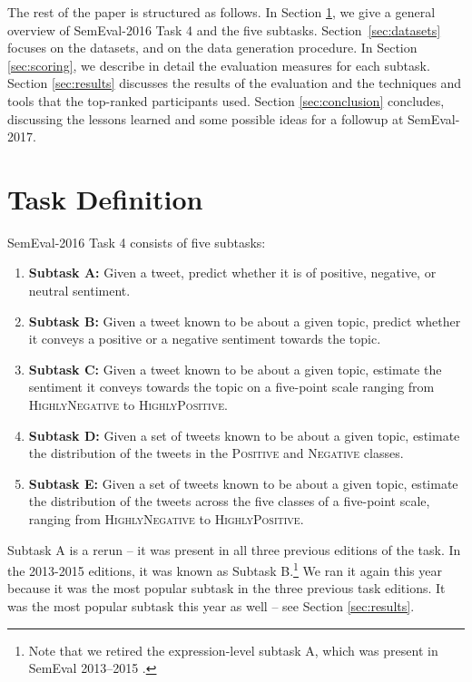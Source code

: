 \documentclass[11pt,letterpaper]{article}
\begin{document}
The rest of the paper is structured as follows. In Section
\ref{sec:task}, we give a general overview of SemEval-2016 Task 4 and 
the five subtasks.
Section~\ref{sec:datasets} focuses on the datasets,
and on the data generation procedure. In Section \ref{sec:scoring},
we describe in detail the evaluation measures for each subtask.
Section \ref{sec:results} discusses the results of
the evaluation and the techniques and tools that the
top-ranked participants used. Section \ref{sec:conclusion}
concludes, discussing the lessons learned and some possible ideas for a followup at SemEval-2017.


\section{Task Definition}
\label{sec:task}

\noindent SemEval-2016 Task 4 consists of five subtasks:

\begin{enumerate}
%
\item \textbf{Subtask A:} Given a tweet, predict whether it is of
  positive, negative, or neutral sentiment.
%
\item \textbf{Subtask B:} Given a tweet known to be about a given topic,
  predict whether it conveys a positive or a negative sentiment
  towards the topic.
%
\item \textbf{Subtask C:} Given a tweet known to be about a given topic,
  estimate the sentiment it conveys towards the topic on a
  five-point scale ranging from \textsc{HighlyNegative} to
  \textsc{HighlyPositive}.
%
\item \textbf{Subtask D:} Given a set of tweets known to be about a given
  topic, estimate the distribution of the tweets in the
  \textsc{Positive} and \textsc{Negative} classes.

\item \textbf{Subtask E:} Given a set of tweets known to be about a given
  topic, estimate the distribution of the tweets across the five
  classes of a five-point scale, ranging from \textsc{HighlyNegative}
  to \textsc{HighlyPositive}.

\end{enumerate}

\noindent Subtask A is a rerun -- it was present in all three previous
editions of the task. In the 2013-2015 editions, it was known as
Subtask B.\footnote{Note that we retired the expression-level subtask A, which was present in SemEval 2013--2015 \cite{Nakov:2013ty,Rosenthal:2014ty,Rosenthal:2015ty,Nakov:2016rm}.} We ran it again this year because it was the most popular subtask in
the three previous task editions. It was the most popular subtask this
year as well -- see Section \ref{sec:results}.
\end{document}
